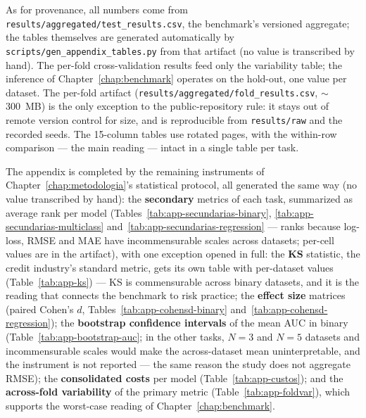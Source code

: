 As for provenance, all numbers come from
\texttt{results/\allowbreak aggregated/\allowbreak test\_\allowbreak results.\allowbreak csv},
the benchmark's versioned aggregate; the tables themselves are
generated automatically by
\texttt{scripts/\allowbreak gen\_\allowbreak appendix\_\allowbreak tables.\allowbreak py}
from that artifact (no value is transcribed by hand). The
per-fold cross-validation results feed only the variability table;
the inference of Chapter~\ref{chap:benchmark} operates on the
hold-out, one value per dataset. The per-fold artifact
(\texttt{results/\allowbreak aggregated/\allowbreak fold\_\allowbreak results.\allowbreak csv},
$\sim$300~MB) is the only exception to the public-repository rule: it
stays out of remote version control for size, and is reproducible
from \texttt{results/raw} and the recorded seeds. The 15-column
tables use rotated pages, with the within-row comparison --- the main
reading --- intact in a single table per task.

The appendix is completed by the remaining instruments of
Chapter~\ref{chap:metodologia}'s statistical protocol, all generated
the same way (no value transcribed by hand): the \textbf{secondary}
metrics of each task, summarized as average rank per model
(Tables~\ref{tab:app-secundarias-binary},
\ref{tab:app-secundarias-multiclass}
and~\ref{tab:app-secundarias-regression} --- ranks because log-loss,
RMSE and MAE have incommensurable scales across datasets; per-cell
values are in the artifact), with one exception opened in full: the
\textbf{KS} statistic, the credit industry's standard metric, gets
its own table with per-dataset values (Table~\ref{tab:app-ks}) ---
KS is commensurable across binary datasets, and it is the reading
that connects the benchmark to risk practice; the \textbf{effect
size} matrices (paired Cohen's $d$,
Tables~\ref{tab:app-cohensd-binary}
and~\ref{tab:app-cohensd-regression}); the \textbf{bootstrap
confidence intervals} of the mean AUC in binary
(Table~\ref{tab:app-bootstrap-auc}; in the other tasks, $N{=}3$ and
$N{=}5$ datasets and incommensurable scales would make the
across-dataset mean uninterpretable, and the instrument is not
reported --- the same reason the study does not aggregate RMSE); the
\textbf{consolidated costs} per model (Table~\ref{tab:app-custos});
and the \textbf{across-fold variability} of the primary metric
(Table~\ref{tab:app-foldvar}), which supports the worst-case reading
of Chapter~\ref{chap:benchmark}.

